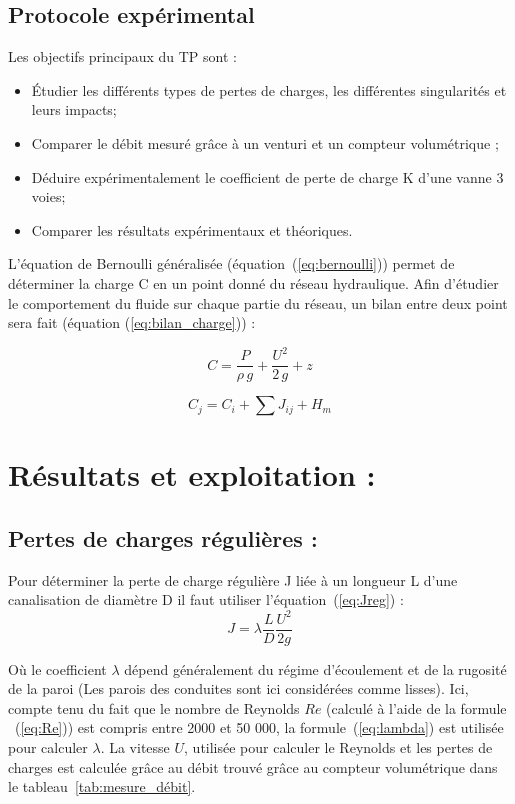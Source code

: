 \documentclass[12pt, a4paper, twoside]{article} %
\begin{document}
\subsection*{Protocole expérimental } 
Les objectifs principaux du TP sont : 
\begin{itemize}
    \item \'Etudier les différents types de pertes de charges, les différentes singularités et leurs impacts;
    \item Comparer le débit mesuré grâce à un venturi et un compteur volumétrique ;
    \item Déduire expérimentalement le coefficient de perte de charge K d'une vanne 3 voies; 
    \item Comparer les résultats expérimentaux et théoriques.
\end{itemize}

L'équation de Bernoulli généralisée (équation~(\ref{eq:bernoulli})) permet de déterminer la charge C en un point donné du réseau hydraulique. 
Afin d'étudier le comportement du fluide sur chaque partie du réseau, un  bilan entre deux point sera fait (équation (\ref{eq:bilan_charge})) : 

\begin{equation}
    C = \frac{P}{\rho \, g} + \frac{U^2}{2 \, g} + z
    \label{eq:bernoulli}
\end{equation}

\begin{equation}
   C_j = C_i + \sum J_{ij} + H_m
    \label{eq:bilan_charge}
\end{equation}
\clearpage
\section{Résultats et exploitation :}

\subsection{Pertes de charges régulières : }
Pour déterminer la perte de charge régulière J liée à un longueur L d'une canalisation de diamètre D il faut utiliser l'équation~(\ref{eq:Jreg}) :
\begin{equation}
    J=\lambda\frac{L}{D}\frac{U^{2}}{2g}
    \label{eq:Jreg}
\end{equation}

Où le coefficient $\lambda$ dépend généralement du régime d'écoulement et de la rugosité de la paroi (Les parois des conduites sont ici considérées comme lisses). Ici, compte tenu du fait que le nombre de Reynolds $Re$ (calculé à l'aide de la formule ~(\ref{eq:Re})) est compris entre 2000 et 50 000, la formule~(\ref{eq:lambda}) est utilisée pour calculer $\lambda$. La vitesse $U$, utilisée pour calculer le Reynolds et les pertes de charges est calculée grâce au débit trouvé grâce au compteur volumétrique dans le tableau~\ref{tab:mesure_débit}. 
\end{document}
